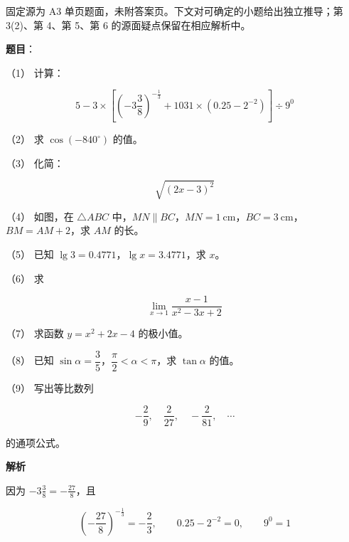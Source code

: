 

\begin{gktip}
固定源为 A3 单页题面，未附答案页。下文对可确定的小题给出独立推导；第 3(2)、第 4、第 5、第 6 的源面疑点保留在相应解析中。
\end{gktip}

\begin{answer}

\textbf{题目}：

（1） 计算：

\nopagebreak[4]
\[
5-3\times\left[\left(-3\frac38\right)^{-\frac13}+1031\times\left(0.25-2^{-2}\right)\right]\div9^0
\]

（2） 求 $\cos(-840^\circ)$ 的值。

（3） 化简：

\nopagebreak[4]
\[
\sqrt{(2x-3)^2}
\]

（4） 如图，在 $\triangle ABC$ 中，$MN\parallel BC$，$MN=1\ \mathrm{cm}$，$BC=3\ \mathrm{cm}$，$BM=AM+2$，求 $AM$ 的长。
\nopagebreak[4]
\begin{center}\end{center}
\nopagebreak[4]
（5） 已知 $\lg3=0.4771$，$\lg x=3.4771$，求 $x$。

（6） 求

\nopagebreak[4]
\[
\lim_{x\to1}\frac{x-1}{x^2-3x+2}
\]

（7） 求函数 $y=x^2+2x-4$ 的极小值。

（8） 已知 $\sin\alpha=\dfrac35$，$\dfrac\pi2<\alpha<\pi$，求 $\tan\alpha$ 的值。

（9） 写出等比数列

\nopagebreak[4]
\[
-\frac29,\quad \frac2{27},\quad -\frac2{81},\quad\cdots
\]

的通项公式。

\textbf{解析}


因为 $-3\frac38=-\frac{27}{8}$，且

\nopagebreak[4]
\[
\left(-\frac{27}{8}\right)^{-\frac13}=-\frac23,
\qquad
0.25-2^{-2}=0,
\qquad 9^0=1
\]


\end{answer}
